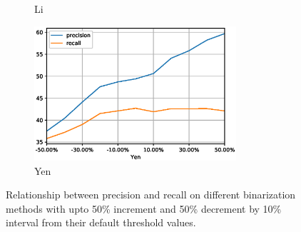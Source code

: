 \documentclass[11pt]{article}
\begin{document}
\begin{figure}[H]
\begin{subfigure}{7cm}
		\caption{Li}
	\end{subfigure}
	\begin{subfigure}[b]{1.0\textwidth}
		\centering
		\includegraphics[width=7.5cm]{files/results/yen.eps}
		\caption{Yen}
	\end{subfigure}

	\caption{Relationship between precision and recall on different binarization methods with upto 50\% increment and 50\% decrement by 10\% interval from their default threshold values.}
	\label{thresh_methods}
\end{figure}

%
%
\end{document}

